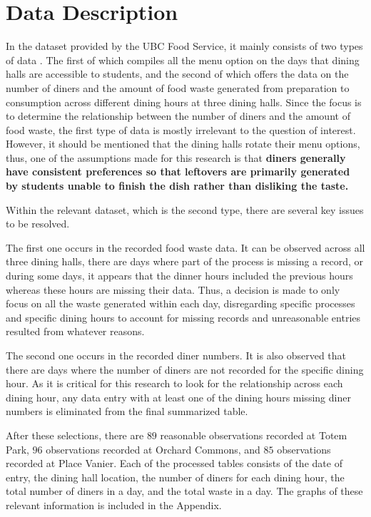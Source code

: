 \section{Data Description}
In the dataset provided by the UBC Food Service, it mainly consists of two types of data \citep{food_waste}. The first of which compiles all the menu option on the days that dining halls are accessible to students, and the second of which offers the data on the number of diners and the amount of food waste generated from preparation to consumption across different dining hours at three dining halls. Since the focus is to determine the relationship between the number of diners and the amount of food waste, the first type of data is mostly irrelevant to the question of interest. However, it should be mentioned that the dining halls rotate their menu options, thus, one of the assumptions made for this research is that \textbf{diners generally have consistent preferences so that leftovers are primarily generated by students unable to finish the dish rather than disliking the taste.}

Within the relevant dataset, which is the second type, there are several key issues to be resolved. 

The first one occurs in the recorded food waste data. It can be observed across all three dining halls, there are days where part of the process is missing a record, or during some days, it appears that the dinner hours included the previous hours whereas these hours are missing their data. Thus, a decision is made to only focus on all the waste generated within each day, disregarding specific processes and specific dining hours to account for missing records and unreasonable entries resulted from whatever reasons.

The second one occurs in the recorded diner numbers. It is also observed that there are days where the number of diners are not recorded for the specific dining hour. As it is critical for this research to look for the relationship across each dining hour, any data entry with at least one of the dining hours missing diner numbers is eliminated from the final summarized table.

After these selections, there are $89$ reasonable observations recorded at Totem Park, $96$ observations recorded at Orchard Commons, and $85$ observations recorded at Place Vanier. Each of the processed tables consists of the date of entry, the dining hall location, the number of diners for each dining hour, the total number of diners in a day, and the total waste in a day. The graphs of these relevant information is included in the Appendix.


